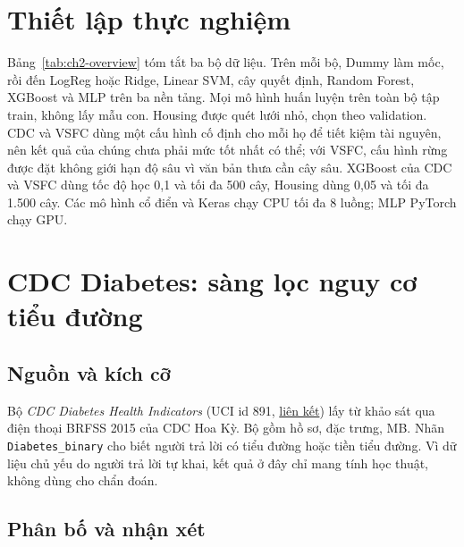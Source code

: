 \section{Thiết lập thực nghiệm}\label{sec:ml-setup}
Bảng~\ref{tab:ch2-overview} tóm tắt ba bộ dữ liệu. Trên mỗi bộ, Dummy làm mốc, rồi đến LogReg hoặc Ridge, Linear SVM, cây quyết định, Random Forest, XGBoost và MLP trên ba nền tảng. Mọi mô hình huấn luyện trên toàn bộ tập train, không lấy mẫu con. Housing được quét lưới nhỏ, chọn theo validation. CDC và VSFC dùng một cấu hình cố định cho mỗi họ để tiết kiệm tài nguyên, nên kết quả của chúng chưa phải mức tốt nhất có thể; với VSFC, cấu hình rừng được đặt không giới hạn độ sâu vì văn bản thưa cần cây sâu. XGBoost của CDC và VSFC dùng tốc độ học 0,1 và tối đa 500 cây, Housing dùng 0,05 và tối đa 1.500 cây. Các mô hình cổ điển và Keras chạy CPU tối đa 8 luồng; MLP PyTorch chạy GPU.



\section{CDC Diabetes: sàng lọc nguy cơ tiểu đường}\label{sec:ml-cdc}
\subsection{Nguồn và kích cỡ}
Bộ \emph{CDC Diabetes Health Indicators} \cite{ch2:ds_cdc} (UCI id 891, \href{https://archive.ics.uci.edu/dataset/891/cdc+diabetes+health+indicators}{liên kết}) lấy từ khảo sát qua điện thoại BRFSS 2015 của CDC Hoa Kỳ. Bộ gồm  hồ sơ,  đặc trưng,  MB. Nhãn \texttt{Diabetes\_binary} cho biết người trả lời có tiểu đường hoặc tiền tiểu đường. Vì dữ liệu chủ yếu do người trả lời tự khai, kết quả ở đây chỉ mang tính học thuật, không dùng cho chẩn đoán.


\subsection{Phân bố và nhận xét}

